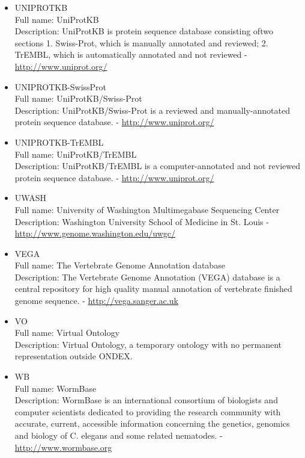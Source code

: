 \begin{itemize}
\item{UNIPROTKB}\\ Full name: UniProtKB\\ Description: UniProtKB is protein sequence database consisting oftwo sections 1. Swiss-Prot, which is manually annotated and reviewed; 2. TrEMBL, which is automatically annotated and not reviewed - 
\url{http://www.uniprot.org/}

\item{UNIPROTKB-SwissProt}\\ Full name: UniProtKB/Swiss-Prot\\ Description: UniProtKB/Swiss-Prot is a reviewed and manually-annotated protein sequence database. - 
\url{http://www.uniprot.org/}

\item{UNIPROTKB-TrEMBL}\\ Full name: UniProtKB/TrEMBL\\ Description: UniProtKB/TrEMBL is a computer-annotated and not reviewed protein sequence database. - 
\url{http://www.uniprot.org/}

\item{UWASH}\\ Full name: University of Washington Multimegabase Sequencing Center\\ Description: Washington University School of Medicine in St. Louis - 
\url{http://www.genome.washington.edu/uwgc/}

\item{VEGA}\\ Full name: The Vertebrate Genome Annotation database\\ Description: The Vertebrate Genome Annotation (VEGA) database is a central repository for high quality manual annotation of vertebrate finished genome sequence. - 
\url{http://vega.sanger.ac.uk}

\item{VO}\\ Full name: Virtual Ontology\\ Description: Virtual Ontology, a temporary ontology with no permanent representation outside ONDEX. 

\item{WB}\\ Full name: WormBase\\ Description: WormBase is an international consortium of biologists and computer scientists dedicated to providing the research community with accurate, current, accessible information concerning the genetics, genomics and biology of C. elegans and some related nematodes. - 
\url{http://www.wormbase.org}


\end{itemize}
